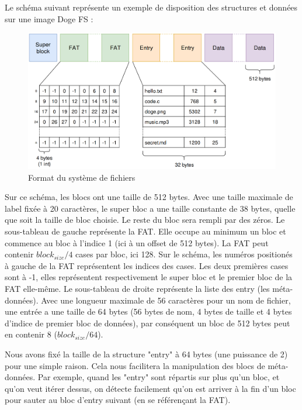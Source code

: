 \documentclass[a4paper, 12pt]{article}
\begin{document}
Le schéma suivant représente un exemple de disposition des structures et données sur une image Doge FS :
\begin{figure}
	\begin{center}
		\includegraphics[width=1.0\textwidth]{schema.png}
		\caption{Format du système de fichiers}
	\end{center}
\end{figure}
Sur ce schéma, les blocs ont une taille de 512 bytes. Avec une taille maximale de label fixée à 20 caractères,
le super bloc a une taille constante de 38 bytes, quelle que soit la taille de bloc choisie. Le reste du bloc
sera rempli par des zéros.
Le sous-tableau de gauche représente la FAT. Elle occupe au minimum un bloc et commence au bloc à l'indice 1 (ici à un offset de 512 bytes).
La FAT peut contenir $block_{size} / 4$ cases par bloc, ici 128. Sur le schéma, les numéros positionés à gauche de la
FAT représentent les indices des cases. Les deux premières cases sont à -1, elles représentent respectivement
le super bloc et le premier bloc de la FAT elle-même.
Le sous-tableau de droite représente la liste des entry (les méta-données). Avec une longueur maximale de 56
caractères pour un nom de fichier, une entrée a une taille de 64 bytes (56 bytes de nom, 4 bytes de taille et
4 bytes d'indice de premier bloc de données), par conséquent un bloc de 512 bytes peut en contenir 8 
($block_{size} / 64$). 
\bigbreak

Nous avons fixé la taille de la structure "entry" à 64 bytes (une puissance de 2) pour une simple raison.
Cela nous facilitera la manipulation des blocs de méta-données. Par exemple,
quand les "entry" sont répartis sur plus qu'un bloc, et qu'on veut itérer dessus, on détecte facilement 
qu'on est arriver à la fin d'un bloc pour sauter au bloc d'entry suivant (en se référençant la FAT).
\bigbreak
\end{document}
